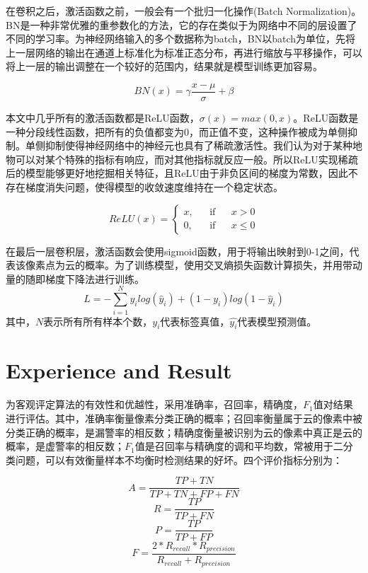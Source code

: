 \documentclass[UTF8]{ctexart}
\begin{document}
在卷积之后，激活函数之前，一般会有一个批归一化操作\cite{ioffe2015batch}(Batch Normalization)。BN是一种非常优雅的重参数化的方法，它的存在类似于为网络中不同的层设置了不同的学习率。为神经网络输入的多个数据称为batch，BN以batch为单位，先将上一层网络的输出在通道上标准化为标准正态分布，再进行缩放与平移操作，可以将上一层的输出调整在一个较好的范围内，结果就是模型训练更加容易。

\begin{equation}
    BN(x) = \gamma\frac{x-\mu}{\sigma}+\beta
\end{equation}

本文中几乎所有的激活函数都是ReLU函数，$\sigma(x)=max(0,x)$。ReLU函数是一种分段线性函数，把所有的负值都变为0，而正值不变，这种操作被成为单侧抑制。单侧抑制使得神经网络中的神经元也具有了稀疏激活性。我们认为对于某种地物可以对某个特殊的指标有响应，而对其他指标就反应一般。所以ReLU实现稀疏后的模型能够更好地挖掘相关特征，且ReLU由于非负区间的梯度为常数，因此不存在梯度消失问题，使得模型的收敛速度维持在一个稳定状态。

\begin{equation}
    ReLU(x)=\left\{
    \begin{aligned}
        x, & &\text{if} & & x > 0 \\
        0, & &\text{if} & & x \leq 0
    \end{aligned}
    \right.
\end{equation}

在最后一层卷积层，激活函数会使用sigmoid函数，用于将输出映射到0-1之间，代表该像素点为云的概率。为了训练模型，使用交叉熵损失函数计算损失，并用带动量的随即梯度下降法进行训练。
\begin{equation}
    L = -\sum_{i=1}^N y_ilog(\hat{y}_i)+(1-y_i)log(1-\hat{y}_i)
\end{equation}
其中，$N$表示所有所有样本个数，$y_i$代表标签真值，$\hat{y_i}$代表模型预测值。

\section[]{Experience and Result}

为客观评定算法的有效性和优越性，采用准确率，召回率，精确度，$F_1$值对结果进行评估。其中，准确率衡量像素分类正确的概率；召回率衡量属于云的像素中被分类正确的概率，是漏警率的相反数；精确度衡量被识别为云的像素中真正是云的概率，是虚警率的相反数；$F_1$值是召回率与精确度的调和平均数，常被用于二分类问题，可以有效衡量样本不均衡时检测结果的好坏。四个评价指标分别为：

\begin{equation}
    A = \frac{TP + TN}{TP + TN + FP + FN}\label{acc}
\end{equation}
\begin{equation}
    R = \frac{TP}{TP + FN}\label{recall}
\end{equation}
\begin{equation}
    P = \frac{TP}{TP + FP}\label{precision}
\end{equation}
\begin{equation}
    F = \frac{2 * R_{recall} * R_{precision}}{R_{recall} + R_{precision}}\label{f1}
\end{equation}
\end{document}
